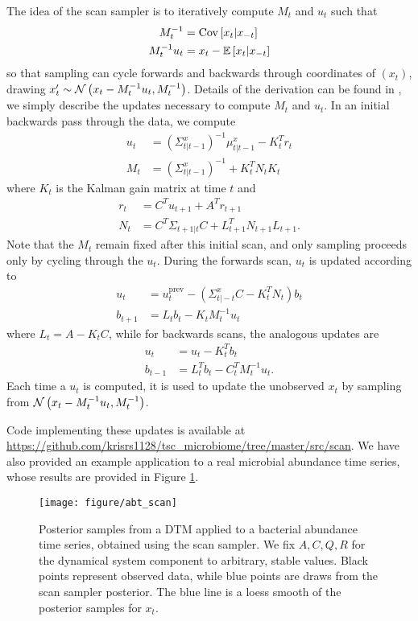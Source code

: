 \documentclass{article}
\begin{document}
The idea of the scan sampler is to iteratively compute $M_t$ and $u_t$ such that
\begin{align*}
  M_t^{-1} &= \mathrm{Cov}\left[{x_t \vert x_{-t}}\right] \\
  M_t^{-1}u_t &= x_t - \mathbb{E}\left[{x_t \vert x_{-t}}\right]
\end{align*}
so that sampling can cycle forwards and backwards through coordinates of
$\left(x_t\right)$, drawing $x_t^{\prime} \sim \mathcal{N}\left(x_t - M_t^{-1}u_t,
M_t^{-1}\right)$. Details of the derivation can be found in \citep{de1997scan},
we simply describe the updates necessary to compute $M_t$ and $u_t$. In an
initial backwards pass through the data, we compute
\begin{align*}
  u_t &= \left(\Sigma_{t \vert t - 1}^{x}\right)^{-1}\mu_{t \vert t - 1}^{x} - K_t^{T}r_t \\
  M_t &= \left(\Sigma_{t \vert t - 1}^{x}\right)^{-1} + K_t^{T} N_t K_t
\end{align*}
where $K_t$ is the Kalman gain matrix at time $t$ and
\begin{align*}
  r_t &= C^T u_{t + 1} + A^{T}r_{t + 1} \\
  N_t &= C^{T} \Sigma_{t + 1 \vert t}C + L_{t + 1}^{T}N_{t + 1}L_{t + 1}.
\end{align*}
Note that the $M_t$ remain fixed after this initial scan, and only sampling
proceeds only by cycling through the $u_t$. During the forwards scan, $u_t$ is
updated according to
\begin{align*}
  u_t &= u_t^{\text{prev}} - \left(\Sigma_{t \vert -t}^{x} C - K_t^{T}N_t\right) b_t \\
  b_{t + 1} &= L_{t} b_t - K_t M_t^{-1}u_t
\end{align*}
where $L_t = A - K_t C$, while for backwards scans, the analogous updates are
\begin{align*}
  u_t &= u_t - K_t^{T} b_t \\
  b_{t - 1} &= L_t^T b_t - C_t^{T}M_t^{-1}u_t.
\end{align*}
Each time a $u_t$ is computed, it is used to update the unobserved $x_t$ by
sampling from $\mathcal{N}\left(x_t - M_t^{-1}u_t, M_t^{-1}\right)$.

Code implementing these updates is available at
\url{https://github.com/krisrs1128/tsc_microbiome/tree/master/src/scan}. We have
also provided an example application to a real microbial abundance time series,
whose results are provided in Figure \ref{fig:abt_scan}.

\begin{figure}[ht]
  \centering
  \texttt{[image: figure/abt\_scan]}
  \caption{Posterior samples from a DTM applied to a bacterial abundance time
    series, obtained using the scan sampler. We fix $A, C, Q, R$ for the
    dynamical system component to arbitrary, stable values. Black points
    represent observed data, while blue points are draws from the scan sampler
    posterior. The blue line is a loess smooth of the posterior samples for
    $x_t$.
    \label{fig:abt_scan}}
\end{figure}
\end{document}
